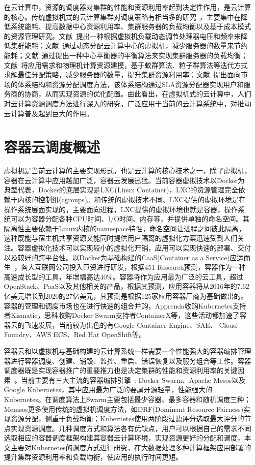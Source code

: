 在云计算中，资源的调度器对集群的性能和资源利用率起到决定性作用，是云计算的核心。传统虚拟机式的云计算集群对调度策略有相当多的研究~\cite{CloudSummarize}，主要集中在降低系统能耗、提高数据中心资源利用率、集群服务器的负载均衡以及基于成本模式的资源管理研究。文献~提出一种根据虚拟机负载动态调节处理器电压和频率来降低集群能耗；文献~通过动态分配云计算中心的虚拟机，减少服务器的数量来节约能耗；文献~通过提出一种中心平衡器的平衡算法来实现集群服务器的负载均衡；文献~将应用需求和物理机计算资源建模，基于蚁群算法、粒子群算法等迭代方式求解最佳分配策略，减少服务器的数量，提升集群资源利用率；文献~提出面向市场的体系结构和资源分配调度方法，该体系结构通过SLA资源分配器实现用户和服务商的协商，从而实现资源的优化配置。由此看出，在虚拟机式的云计算中，人们对云计算资源调度方法进行深入的研究，广泛应用于当前的云计算系统中，对推动云计算普及起到巨大的作用。

\section{容器云调度概述}
虚拟机是当前云计算的主要实现形式，也是云计算的核心技术之一，除了虚拟机，容器在云计算中应用越加广泛，容器云发展迅猛。当前容器虚拟技术以Docker为典型代表，Docker的底层实现是LXC(Linux Container)，LXC的资源管理完全依赖于内核的控制组(cgroups)。和传统的虚拟技术不同、LXC提供的虚拟环境是在操作系统层面实现的，主要面向进程，LXC提供的虚拟环境也就是容器，操作系统可以为容器分配各种CPU时间、I/O时间、内存等，并提供单独的命名空间。其隔离性主要依赖于Linux内核的namespace特性，命名空间让进程之间彼此隔离，这种既能与宿主机共享资源又能同时提供用户隔离的虚拟化方案迅速受到人们关注。容器虚拟化技术可以实现较小的虚拟化开销，应用可以实现快速的部署、交付以及较好的跨平台性。以Docker为基础构建的CaaS(Container as a Service)应运而生~\cite{Kozhirbayev2017A}，各大互联网公司投入巨资进行研发，根据451 Research预测，容器作为一种高速成长型的工具，年增幅高达40\%。容器将作为应用最为广泛的云工具，超过OpenStack、PaaS以及其他相关的产品，根据其预测，应用容器将从2016年的7.62亿美元增长到2020的27亿美元，其预测是根据125家应用容器厂商为基础做出的。容器的管理和调度市场也在进行快速的组合并购，Apprenda收购Kubernetes支持者Kismatic，思科收购Docker Swarm支持者ContainerX等，这些活动都加速了容器云的飞速发展，当前较为出色的有Google Container Engine、SAE、 Cloud Foundry、AWS ECS、Red Hat OpenShift等。

容器云和以虚拟机与基础构建的云计算系统一样需要一个性能强大的容器编排管理器进行容器调度、创建、销毁、监控、重启、错误恢复以及服务组合等工作。容器调度器既是实现容器推广的重要推力也是决定集群的性能和资源利用率的关键因素~\cite{Application2017}。当前主要有三大主流的容器编排引擎~\cite{Usman2016}: Docker Swarm、Apache Mesos以及Google Kubernetes，其中应用最为广泛的要属开源轻量，性能强大的Kubernetes。在调度算法上Swarm主要包括最少容器、最多容器和随机调度三种；Memsos更多使用传统的虚拟机调度方法，如DRF(Dominant Resource Fairness)实现资源分配，侧重于负载均衡；Kubernetes使用两阶段过滤评分选取最大评分的节点实现资源调度。几种调度方式和算法各有优缺点，用户可以根据自己的需求不同选取相应的容器调度框架构建其容器云计算环境，实现资源更好的分配和调度，本文主要对Kubernetes的调度方式进行研究，在大数据处理多种计算框架应用部署的提升集群资源利用率和负载均衡，使应用的执行时间更短。

